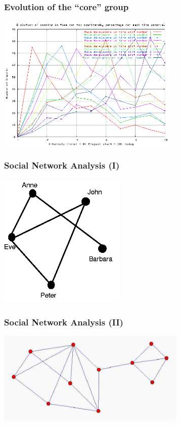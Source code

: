 \documentclass{beamer}
\begin{document}

\begin{frame}
\frametitle{Evolution of the ``core'' group}

\begin{center}
\includegraphics[height=6.5cm]{figs/mozilla_log-per_10_22.png}
\end{center}

\end{frame}


\begin{frame}
\frametitle{Social Network Analysis (I)}

\begin{center}
\includegraphics[width=6cm]{figs/simple-sna.png}
\end{center}

\end{frame}


\begin{frame}
\frametitle{Social Network Analysis (II)}

\begin{center}
\includegraphics[width=9cm]{figs/sna-one.png}
\end{center}

\end{frame}
\end{document}
